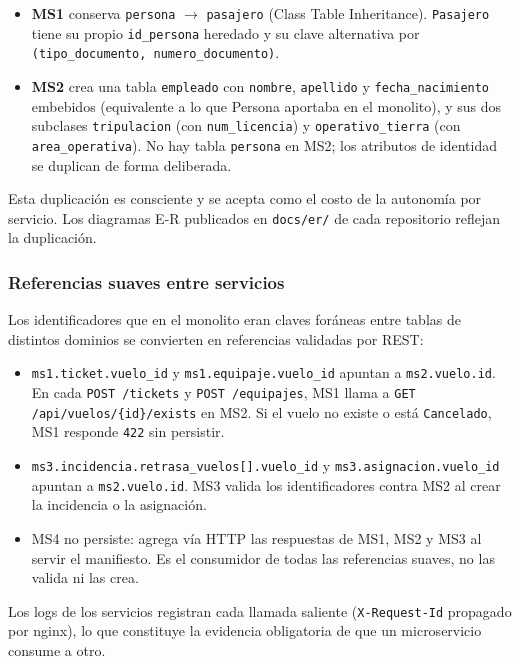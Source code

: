 \begin{itemize}
  \item \textbf{MS1} conserva \texttt{persona} $\to$ \texttt{pasajero}
    (Class Table Inheritance). \texttt{Pasajero} tiene su propio
    \texttt{id\_persona} heredado y su clave alternativa por
    \texttt{(tipo\_documento, numero\_documento)}.
  \item \textbf{MS2} crea una tabla \texttt{empleado} con
    \texttt{nombre}, \texttt{apellido} y \texttt{fecha\_nacimiento}
    embebidos (equivalente a lo que Persona aportaba en el monolito), y
    sus dos subclases \texttt{tripulacion} (con \texttt{num\_licencia}) y
    \texttt{operativo\_tierra} (con \texttt{area\_operativa}). No hay
    tabla \texttt{persona} en MS2; los atributos de identidad se duplican
    de forma deliberada.
\end{itemize}

Esta duplicación es consciente y se acepta como el costo de la autonomía
por servicio. Los diagramas E-R publicados en \texttt{docs/er/} de cada
repositorio reflejan la duplicación.

\subsubsection{Referencias suaves entre servicios}
Los identificadores que en el monolito eran claves foráneas entre tablas
de distintos dominios se convierten en referencias validadas por REST:

\begin{itemize}
  \item \texttt{ms1.ticket.vuelo\_id} y \texttt{ms1.equipaje.vuelo\_id}
    apuntan a \texttt{ms2.vuelo.id}. En cada \texttt{POST /tickets} y
    \texttt{POST /equipajes}, MS1 llama a
    \texttt{GET /api/vuelos/\{id\}/exists} en MS2. Si el vuelo no existe
    o está \texttt{Cancelado}, MS1 responde \texttt{422} sin persistir.
  \item \texttt{ms3.incidencia.retrasa\_vuelos[].vuelo\_id} y
    \texttt{ms3.asignacion.vuelo\_id} apuntan a \texttt{ms2.vuelo.id}.
    MS3 valida los identificadores contra MS2 al crear la incidencia o
    la asignación.
  \item MS4 no persiste: agrega vía HTTP las respuestas de MS1, MS2 y
    MS3 al servir el manifiesto. Es el consumidor de todas las
    referencias suaves, no las valida ni las crea.
\end{itemize}

Los logs de los servicios registran cada llamada saliente
(\texttt{X-Request-Id} propagado por nginx), lo que constituye la
evidencia obligatoria de que un microservicio consume a otro.

